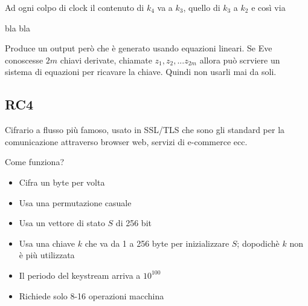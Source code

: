 Ad ogni colpo di clock il contenuto di $k_4$ va a $k_3$, quello di $k_3$ a $k_2$ e così via

bla bla

Produce un output però che è generato usando equazioni lineari. Se Eve conoscesse $2m$ chiavi derivate, chiamate $z_1,z_2,...z_{2m}$ allora può scrviere un sistema di equazioni per ricavare la chiave. Quindi non usarli mai da soli.

\subsection*{RC4}

Cifrario a flusso più famoso, usato in SSL/TLS che sono gli standard per la comunicazione attraverso browser web, servizi di e-commerce ecc.

Come funziona?
\begin{itemize}
	\item Cifra un byte per volta
	\item Usa una permutazione casuale
	\item Usa un vettore di stato $S$ di 256 bit
	\item Usa una chiave $k$ che va da 1 a 256 byte per inizializzare $S$; dopodichè $k$ non è più utilizzata
	\item Il periodo del keystream arriva a $10^{100}$
	\item Richiede solo 8-16 operazioni macchina
\end{itemize}

